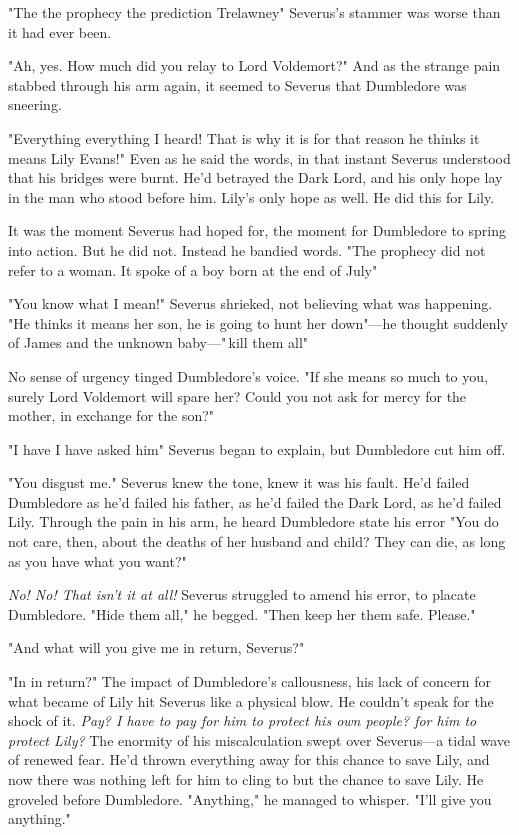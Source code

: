 "The{\el} the prophecy{\el} the prediction{\el} Trelawney{\el}" Severus's stammer was worse than it had ever been.

"Ah, yes. How much did you relay to Lord Voldemort?" And as the strange pain stabbed through his arm again, it seemed to Severus that Dumbledore was sneering.

"Everything{\el} everything I heard! That is why{\el} it is for that reason{\el} he thinks it means Lily Evans!" Even as he said the words, in that instant Severus understood that his bridges were burnt. He'd betrayed the Dark Lord, and his only hope lay in the man who stood before him. Lily's only hope as well. He did this for Lily.

It was the moment Severus had hoped for, the moment for Dumbledore to spring into action. But he did not. Instead he bandied words. "The prophecy did not refer to a woman. It spoke of a boy born at the end of July{\el}"

"You know what I mean!" Severus shrieked, not believing what was happening. "He thinks it means her son, he is going to hunt her down{\el}"—he thought suddenly of James and the unknown baby—"{\el}\,kill them all{\el}"

No sense of urgency tinged Dumbledore's voice. "If she means so much to you, surely Lord Voldemort will spare her? Could you not ask for mercy for the mother, in exchange for the son?"

"I have{\el} I have asked him{\el}" Severus began to explain, but Dumbledore cut him off.

"You disgust me." Severus knew the tone, knew it was his fault. He'd failed Dumbledore as he'd failed his father, as he'd failed the Dark Lord, as he'd failed Lily. Through the pain in his arm, he heard Dumbledore state his error{\el} "You do not care, then, about the deaths of her husband and child? They can die, as long as you have what you want?"

\emph{No! No! That isn't it at all!} Severus struggled to amend his error, to placate Dumbledore. "Hide them all," he begged. "Then{\el} keep her{\el} them{\el} safe. Please."

"And what will you give me in return, Severus?"

"In{\el} in return?" The impact of Dumbledore's callousness, his lack of concern for what became of Lily hit Severus like a physical blow. He couldn't speak for the shock of it. \emph{Pay? I have to pay for him to protect his own people? for him to protect Lily?} The enormity of his miscalculation swept over Severus—a tidal wave of renewed fear. He'd thrown everything away for this chance to save Lily, and now there was nothing left for him to cling to but the chance to save Lily. He groveled before Dumbledore. "Anything," he managed to whisper. "I'll give you anything."

